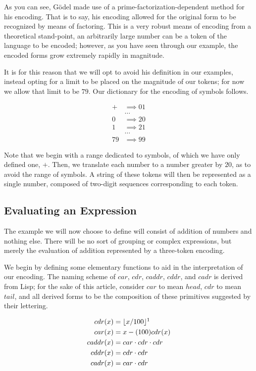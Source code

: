 \documentclass{article}
\DeclarePairedDelimiter{\floor}{\lfloor}{\rfloor}
\begin{document}
As you can see, G\"odel made use of a prime-factorization-dependent method for his encoding. That is
to say, his encoding allowed for the original form to be recognized by means of factoring. This is a
very robust means of encoding from a theoretical stand-point, an arbitrarily large number can be a
token of the language to be encoded; however, as you have seen through our example, the encoded forms
grow extremely rapidly in magnitude.

It is for this reason that we will opt to avoid his definition in our examples, instead opting for 
a limit to be placed on the magnitude of our tokens; for now we allow that limit to be $79$. Our 
dictionary for the encoding of symbols follows.

\begin{align*}
    + &\implies 01
\\  &\dots
\\  0 &\implies 20
\\  1 &\implies 21
\\  &\dots
\\  79 &\implies 99
\end{align*}

Note that we begin with a range dedicated to symbols, of which we have only defined one, $+$. Then, we
translate each number to a number greater by $20$, as to avoid the range of symbols. A string of these
tokens will then be represented as a single number, composed of two-digit sequences corresponding to
each token.

\subsection{Evaluating an Expression}
The example we will now choose to define will consist of addition of numbers and nothing else. There
will be no sort of grouping or complex expressions, but merely the evaluation of addition represented by
a three-token encoding. 

We begin by defining some elementary functions to aid in the interpretation of our encoding. The naming 
scheme of $car$, $cdr$, $caddr$, $cddr$, and $cadr$ is derived from Lisp; for the sake of this article, 
consider $car$ to mean $head$, $cdr$ to mean $tail$, and all derived forms to be the composition of 
these primitives suggested by their lettering.

\begin{align*}
    cdr(x) &= \floor{x / 100}\footnotemark
\\  car(x) &= x - (100)cdr(x)
\\  caddr(x) &= car \cdot cdr \cdot cdr
\\  cddr(x) &= cdr \cdot cdr
\\  cadr(x) &= car \cdot cdr
\end{align*}
\end{document}
